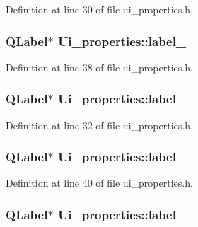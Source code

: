 Definition at line 30 of file ui\_\-properties.h.

\hypertarget{classUi__properties_a1bff93f4244d3116dc1257d7d7dc7a0e}{
\subsubsection[{label\_\-3}]{\setlength{\rightskip}{0pt plus 5cm}QLabel$\ast$ {\bf Ui\_\-properties::label\_}}}
\label{classUi__properties_a1bff93f4244d3116dc1257d7d7dc7a0e}


Definition at line 38 of file ui\_\-properties.h.

\hypertarget{classUi__properties_a3cc1c78396a6ff54c641120805eefe57}{
\subsubsection[{label\_\-4}]{\setlength{\rightskip}{0pt plus 5cm}QLabel$\ast$ {\bf Ui\_\-properties::label\_}}}
\label{classUi__properties_a3cc1c78396a6ff54c641120805eefe57}


Definition at line 32 of file ui\_\-properties.h.

\hypertarget{classUi__properties_a6702ccc6363460b0b6df3068f72785d5}{
\subsubsection[{label\_\-5}]{\setlength{\rightskip}{0pt plus 5cm}QLabel$\ast$ {\bf Ui\_\-properties::label\_}}}
\label{classUi__properties_a6702ccc6363460b0b6df3068f72785d5}


Definition at line 40 of file ui\_\-properties.h.

\hypertarget{classUi__properties_a71f9da68c3afbed85206add43969427d}{
\subsubsection[{label\_\-6}]{\setlength{\rightskip}{0pt plus 5cm}QLabel$\ast$ {\bf Ui\_\-properties::label\_}}}
\label{classUi__properties_a71f9da68c3afbed85206add43969427d}


